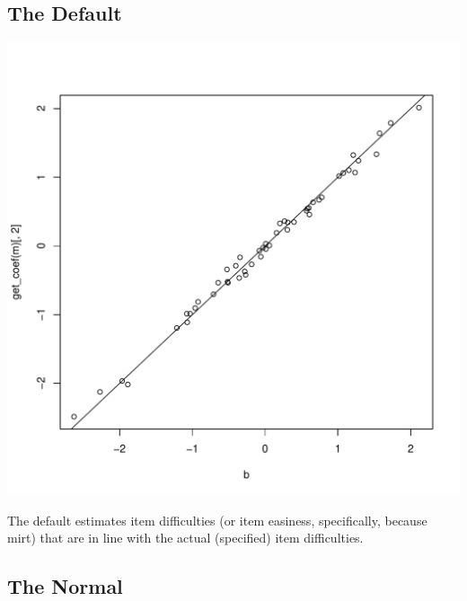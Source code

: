\documentclass{article}\usepackage[]{graphicx}\usepackage[]{color}
\makeatletter
\def\maxwidth{ %
  \ifdim\Gin@nat@width>\linewidth
    \linewidth
  \else
    \Gin@nat@width
  \fi
}
\newenvironment{knitrout}{}{} %
\makeatother
\begin{document}
\subsection{The Default}
\begin{knitrout}
\color{fgcolor}
\includegraphics[width=\maxwidth]{figure/unnamed-chunk-5-1} 

\end{knitrout}

The default estimates item difficulties (or item easiness, specifically, because mirt) that are in line with the actual (specified) item difficulties.

\pagebreak
\subsection{The Normal}
\end{document}
